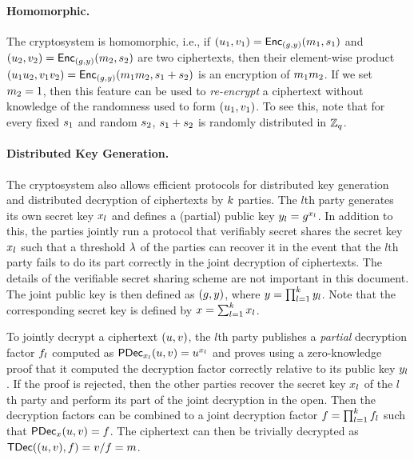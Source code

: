 \documentclass[11pt]{article}
\begin{document}
\paragraph{Homomorphic.}

The cryptosystem is homomorphic, i.e., if
$(u_{1},v_{1})=\textsf{Enc}_{(g,y)}(m_{1},s_{1})$ and
$(u_{2},v_{2})=\textsf{Enc}_{(g,y)}(m_{2},s_{2})$ are two
ciphertexts, then their element-wise product
$(u_{1}u_{2},v_{1}v_{2})=\textsf{Enc}_{(g,y)}(m_{1}m_{2},s_{1}+s_{2})$
is an encryption of $m_{1}m_{2}$. If we set $m_{2}=1$,
then this feature can be used to \emph{re-encrypt} a ciphertext
without knowledge of the randomness used to form
$(u_{1},v_{1})$. To see this, note that for every fixed
$s_{1}$ and random $s_{2}$, $s_{1}+s_{2}$ is randomly
distributed in $\mathbb{Z}_{q}$.

\paragraph{Distributed Key Generation.}

The \elgamal cryptosystem also allows efficient protocols for
distributed key generation and distributed decryption of ciphertexts
by $k$ parties. The $l$th party generates its own secret key
$x_{l}$ and defines a (partial) public key $y_{l}=g^{x_{l}}$. In
addition to this, the parties jointly run a protocol that verifiably
secret shares the secret key $x_{l}$ such that a threshold $\lambda$
of the parties can recover it in the event that the $l$th party fails
to do its part correctly in the joint decryption of ciphertexts. The
details \cite{feld,gennaro} of the verifiable secret sharing scheme
are not important in this document. The joint public key is then
defined as $(g,y)$, where $y=\prod_{l=1}^{k}y_{l}$. Note that
the corresponding secret key is defined by
$x=\sum_{l=1}^{k}x_{l}$.

To jointly decrypt a ciphertext $(u,v)$, the $l$th party
publishes a \emph{partial} decryption factor $f_{l}$ computed
as $\textsf{PDec}_{x_{l}}(u,v)=u^{x_{l}}$ and proves using a
zero-knowledge proof that it computed the decryption factor correctly
relative to its public key $y_{l}$. If the proof is rejected, then
the other parties recover the secret key $x_{l}$ of the $l$th party
and perform its part of the joint decryption in the open. Then the
decryption factors can be combined to a joint decryption factor
$f=\prod_{l=1}^{k}f_{l}$ such that
$\textsf{PDec}_{x}(u,v)=f$. The ciphertext can then be
trivially decrypted as
$\textsf{TDec}((u,v),f)=v/f=m$.
\end{document}
